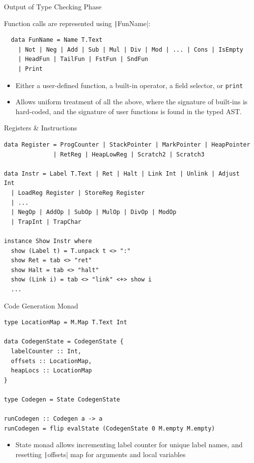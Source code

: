 \documentclass[dvipsnames,aspectratio=169]{beamer}
\begin{document}
\begin{frame}[fragile]{Output of Type Checking Phase}

  Function calls are represented using \texttt|FunName|:

  \begin{verbatim}
  data FunName = Name T.Text
    | Not | Neg | Add | Sub | Mul | Div | Mod | ... | Cons | IsEmpty
    | HeadFun | TailFun | FstFun | SndFun
    | Print
  \end{verbatim}

  \begin{itemize}
    \item Either a user-defined function, a built-in operator, a field selector,
          or \texttt{print}
    \item Allows uniform treatment of all the above, where the signature of
          built-ins is hard-coded, and the signature of user functions is found
          in the typed AST.
  \end{itemize}

\end{frame}



\begin{frame}[fragile]{Registers \& Instructions}

  \begin{verbatim}
data Register = ProgCounter | StackPointer | MarkPointer | HeapPointer
              | RetReg | HeapLowReg | Scratch2 | Scratch3

data Instr = Label T.Text | Ret | Halt | Link Int | Unlink | Adjust Int
  | LoadReg Register | StoreReg Register
  | ...
  | NegOp | AddOp | SubOp | MulOp | DivOp | ModOp
  | TrapInt | TrapChar

instance Show Instr where
  show (Label t) = T.unpack t <> ":"
  show Ret = tab <> "ret"
  show Halt = tab <> "halt"
  show (Link i) = tab <> "link" <+> show i
  ...
\end{verbatim}

\end{frame}



\begin{frame}[fragile]{Code Generation Monad}

\begin{verbatim}
type LocationMap = M.Map T.Text Int

data CodegenState = CodegenState {
  labelCounter :: Int,
  offsets :: LocationMap,
  heapLocs :: LocationMap
}

type Codegen = State CodegenState

runCodegen :: Codegen a -> a
runCodegen = flip evalState (CodegenState 0 M.empty M.empty)
\end{verbatim}

\begin{itemize}
  \item State monad allows incrementing label counter for unique label names,
        and resetting \texttt|offsets| map for arguments and local variables
\end{itemize}

\end{frame}
\end{document}
